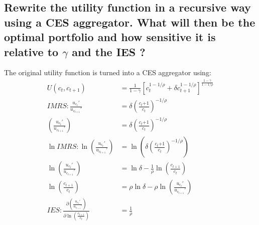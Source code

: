 \documentclass[]{article}
\begin{document}
\subsection{Rewrite the utility function in a recursive way using a CES aggregator. What will then be the optimal portfolio and how sensitive it is relative to $\gamma$ and the IES ?}
The original utility function is turned into a CES aggregator using:
\begin{align*}
	U(c_t, c_{t+1}) &= \frac{1}{1-\gamma} \left[c_t^{1-1/\rho} + \delta c_{t+1}^{1-1/\rho}\right]^{\frac{1-\gamma}{1-1/\rho}}\\
	IMRS: \frac{u_{c_t}'}{u_{c_{t+1}}'} &= \delta \left(\frac{c_t{+1}}{c_t}\right)^{-1/\rho}\\
	\left(\frac{u_{c_t}'}{u_{c_{t+1}}'}\right) &= \delta \left(\frac{c_t{+1}}{c_t}\right)^{-1/\rho}\\
	\ln IMRS: \ln \left(\frac{u_{c_t}'}{u_{c_{t+1}}'}\right) &= \ln \left( \delta \left(\frac{c_t{+1}}{c_t}\right)^{-1/\rho} \right)\\
	\ln \left(\frac{u_{c_t}'}{u_{c_{t+1}}'}\right) &= \ln \delta -\frac{1}{\rho} \ln \left(\frac{c_{t+1}}{c_t}\right) \\
	\ln \left(\frac{c_{t+1}}{c_t}\right) &= \rho \ln \delta - \rho \ln \left(\frac{u_{c_t}'}{u_{c_{t+1}}'}\right)\\
	IES: \frac{\partial \left(\frac{u_{c_t}'}{u_{c_{t+1}}'}\right)}{\partial \ln \left(\frac{c_{t+1}}{c_t}\right)} &= \frac{1}{\rho}
\end{align*}
\end{document}
